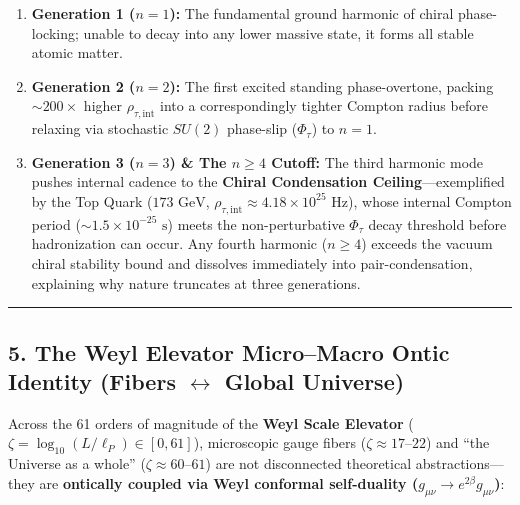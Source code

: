 \documentclass[
]{article}
\providecommand{\tightlist}{%
  \setlength{\itemsep}{0pt}\setlength{\parskip}{0pt}}
\begin{document}
\begin{enumerate}
\def\labelenumi{\arabic{enumi}.}
\tightlist
\item
  \textbf{Generation 1 (\(n = 1\)):} The fundamental ground harmonic of
  chiral phase-locking; unable to decay into any lower massive state, it
  forms all stable atomic matter.
\item
  \textbf{Generation 2 (\(n = 2\)):} The first excited standing
  phase-overtone, packing \(\sim 200\times\) higher
  \(\rho_{\tau,\text{int}}\) into a correspondingly tighter Compton
  radius before relaxing via stochastic \(SU(2)\) phase-slip
  (\(\Phi_\tau\)) to \(n = 1\).
\item
  \textbf{Generation 3 (\(n = 3\)) \& The \(n \ge 4\) Cutoff:} The third
  harmonic mode pushes internal cadence to the \textbf{Chiral
  Condensation Ceiling}---exemplified by the Top Quark
  (\(173\text{ GeV}\),
  \(\rho_{\tau,\text{int}} \approx 4.18 \times 10^{25}\text{ Hz}\)),
  whose internal Compton period (\(\sim 1.5 \times 10^{-25}\text{ s}\))
  meets the non-perturbative \(\Phi_\tau\) decay threshold before
  hadronization can occur. Any fourth harmonic (\(n \ge 4\)) exceeds the
  vacuum chiral stability bound and dissolves immediately into
  pair-condensation, explaining why nature truncates at three
  generations.
\end{enumerate}

\begin{center}\rule{0.5\linewidth}{0.5pt}\end{center}

\subsection{\texorpdfstring{5. The Weyl Elevator Micro--Macro Ontic
Identity (Fibers \(\leftrightarrow\) Global
Universe)}{5. The Weyl Elevator Micro--Macro Ontic Identity (Fibers \textbackslash leftrightarrow Global Universe)}}\label{the-weyl-elevator-micromacro-ontic-identity-fibers-leftrightarrow-global-universe}

Across the 61 orders of magnitude of the \textbf{Weyl Scale Elevator}
(\(\zeta = \log_{10}(L / \ell_P) \in [0, 61]\)), microscopic gauge
fibers (\(\zeta \approx 17\text{--}22\)) and ``the Universe as a whole''
(\(\zeta \approx 60\text{--}61\)) are not disconnected theoretical
abstractions---they are \textbf{ontically coupled via Weyl conformal
self-duality (\(g_{\mu\nu} \to e^{2\beta} g_{\mu\nu}\))}:
\end{document}

